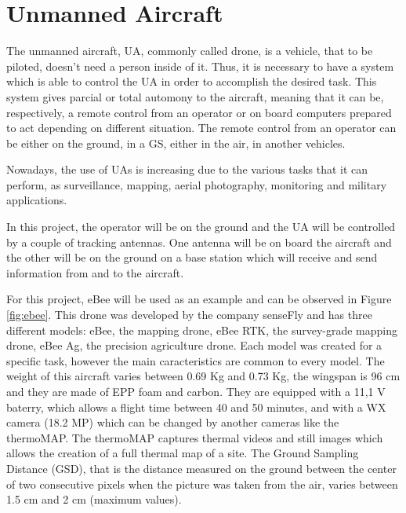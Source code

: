 \section{Unmanned Aircraft}\label{sec:drone}

The unmanned aircraft, UA, commonly called drone, is a vehicle, that to be piloted, doesn't need a person inside of it. Thus, it is necessary to have a system which is able to control the UA in order to accomplish the desired task. This system gives parcial or total automony to the aircraft, meaning that it can be, respectively, a remote control from an operator or on board computers prepared to act depending on different situation. The remote control from an operator can be either on the ground, in a GS, either in the air, in another vehicles.

Nowadays, the use of UAs is increasing due to the various tasks that it can perform, as surveillance, mapping, aerial photography, monitoring and military applications.

In this project, the operator will be on the ground and the UA will be controlled by a couple of tracking antennas. One antenna will be on board the aircraft and the other will be on the ground on a base station which will receive and send information from and to the aircraft. 

For this project, eBee will be used as an example and can be observed in Figure \ref{fig:ebee}. This drone was developed by the company senseFly and has three different models: eBee, the mapping drone, eBee RTK, the survey-grade mapping drone, eBee Ag, the precision agriculture drone. Each model was created for a specific task, however the main caracteristics are common to every model. The weight of this aircraft varies between 0.69 Kg and 0.73 Kg, the wingspan is 96 cm and they are made of EPP foam and carbon. They are equipped with a 11,1 V baterry, which allows a flight time between 40 and 50 minutes, and with a WX camera (18.2 MP) which can be changed by another cameras like the thermoMAP. The thermoMAP captures thermal videos and still images which allows the creation of a full thermal map of a site. The Ground Sampling Distance (GSD), that is the distance measured on the ground between the center of two consecutive pixels when the picture was taken from the air, varies between 1.5 cm and 2 cm (maximum values). 
 
